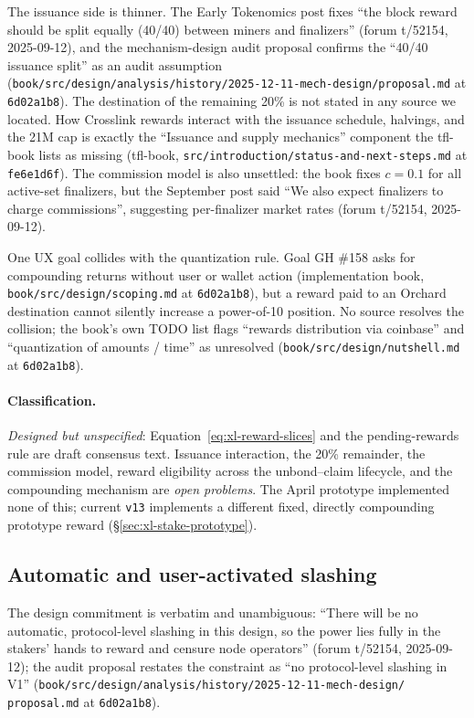 \documentclass[11pt,a4paper]{article}
\theoremstyle{definition}
\begin{document}
The issuance side is thinner. The Early Tokenomics post fixes ``the block
reward should be split equally (40/40) between miners and finalizers''
(forum t/52154, 2025-09-12), and the mechanism-design audit proposal
confirms the ``40/40 issuance split'' as an audit assumption
(\texttt{book/src/design/analysis/history/2025-12-11-mech-design/proposal.md}
at \texttt{6d02a1b8}). The destination of the remaining 20\% is not stated
in any source we located.
How Crosslink rewards interact with the issuance schedule, halvings, and
the 21M cap is exactly the ``Issuance and supply mechanics'' component the
tfl-book lists as missing (tfl-book,
\texttt{src/introduction/status-and-next-steps.md} at \texttt{fe6e1d6f}).
The commission model is also unsettled: the book fixes $c = 0.1$ for all
active-set finalizers, but the September post said ``We also expect
finalizers to charge commissions'', suggesting per-finalizer market rates
(forum t/52154, 2025-09-12).

One UX goal collides with the quantization rule. Goal GH \#158 asks for
compounding returns without user or wallet action (implementation book,
\texttt{book/src/design/scoping.md} at \texttt{6d02a1b8}), but a reward
paid to an Orchard destination cannot silently increase a power-of-10
position. No source resolves the collision; the book's own TODO list
flags ``rewards distribution via coinbase'' and ``quantization of amounts
/ time'' as unresolved (\texttt{book/src/design/nutshell.md} at
\texttt{6d02a1b8}).

\paragraph{Classification.} \emph{Designed but unspecified}:
Equation~\eqref{eq:xl-reward-slices} and the pending-rewards rule are
draft consensus text. Issuance interaction, the 20\% remainder, the
commission model, reward eligibility across the unbond--claim lifecycle,
and the compounding mechanism are \emph{open problems}. The April
prototype implemented none of this; current \texttt{v13} implements a
different fixed, directly compounding prototype reward
(\S\ref{sec:xl-stake-prototype}).

\subsection{Automatic and user-activated slashing}
\label{sec:xl-stake-slashing}

The design commitment is verbatim and unambiguous: ``There will be no
automatic, protocol-level slashing in this design, so the power lies
fully in the stakers' hands to reward and censure node operators''
(forum t/52154, 2025-09-12); the audit proposal restates the constraint
as ``no protocol-level slashing in V1''
(\texttt{book/src/design/analysis/history/2025-12-11-mech-design/}
\texttt{proposal.md} at \texttt{6d02a1b8}).
\end{document}
